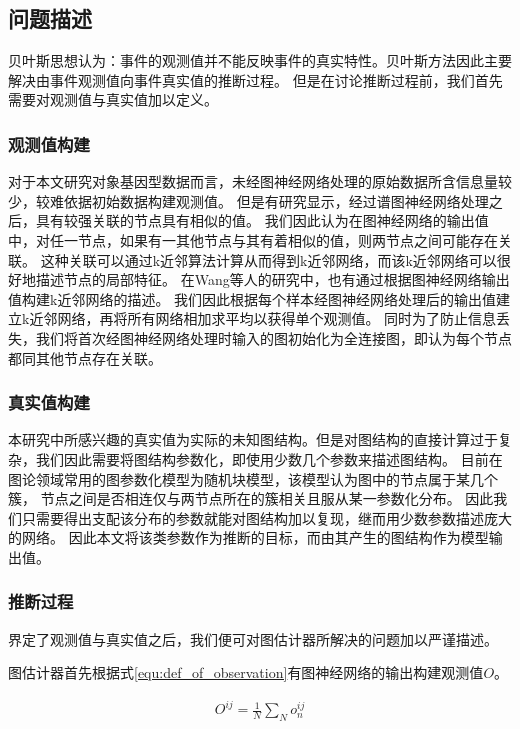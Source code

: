 \subsection{问题描述}
贝叶斯思想认为：事件的观测值并不能反映事件的真实特性。贝叶斯方法因此主要解决由事件观测值向事件真实值的推断过程。
但是在讨论推断过程前，我们首先需要对观测值与真实值加以定义。
\subsubsection{观测值构建}
对于本文研究对象基因型数据而言，未经图神经网络处理的原始数据所含信息量较少，较难依据初始数据构建观测值。
但是有研究显示，经过谱图神经网络处理之后，具有较强关联的节点具有相似的值。\cite{hamilton_inductive_2018} 
我们因此认为在图神经网络的输出值中，对任一节点，如果有一其他节点与其有着相似的值，则两节点之间可能存在关联。
这种关联可以通过k近邻算法\cite{preparata_computational_1985}计算从而得到k近邻网络，而该k近邻网络可以很好地描述节点的局部特征。
在Wang\cite{wang_graph_2021}等人的研究中，也有通过根据图神经网络输出值构建k近邻网络的描述。
我们因此根据每个样本经图神经网络处理后的输出值建立k近邻网络，再将所有网络相加求平均以获得单个观测值。
同时为了防止信息丢失，我们将首次经图神经网络处理时输入的图初始化为全连接图，即认为每个节点都同其他节点存在关联。

\subsubsection{真实值构建}

本研究中所感兴趣的真实值为实际的未知图结构。但是对图结构的直接计算过于复杂，我们因此需要将图结构参数化，即使用少数几个参数来描述图结构。
目前在图论领域常用的图参数化模型为随机块模型\cite{holland_stochastic_1983}，该模型认为图中的节点属于某几个簇，
节点之间是否相连仅与两节点所在的簇相关且服从某一参数化分布。
因此我们只需要得出支配该分布的参数就能对图结构加以复现，继而用少数参数描述庞大的网络。
因此本文将该类参数作为推断的目标，而由其产生的图结构作为模型输出值。

\subsubsection{推断过程}

界定了观测值与真实值之后，我们便可对图估计器所解决的问题加以严谨描述。

图估计器首先根据式\ref{equ:def_of_observation}有图神经网络的输出构建观测值$O$。

\begin{equation}\label{equ:def_of_observation}\begin{aligned}
    O^{ij}=\frac{1}{N}\sum_N o^{ij}_n
\end{aligned}\end{equation}

